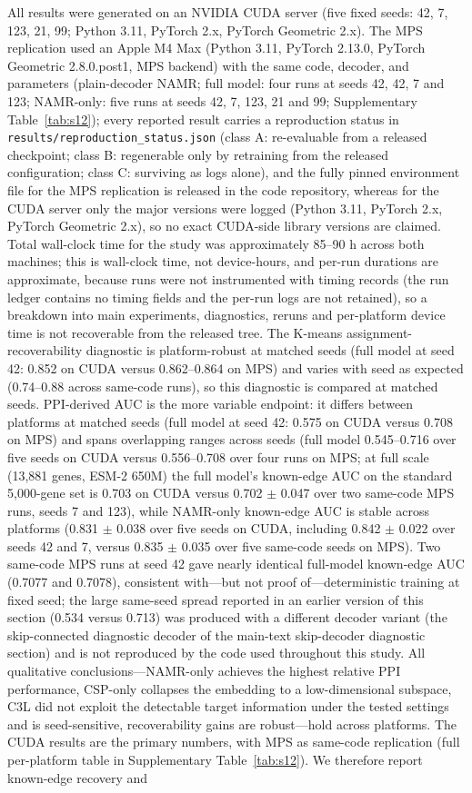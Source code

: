 \documentclass[11pt,a4paper]{article}
\newcommand{\supptab}[1]{Supplementary Table~\ref{#1}}
\begin{document}
All results were generated on an NVIDIA CUDA server (five fixed seeds: 42, 7, 123, 21, 99; Python 3.11, PyTorch 2.x, PyTorch Geometric 2.x). The MPS replication used an Apple M4 Max (Python 3.11, PyTorch 2.13.0, PyTorch Geometric 2.8.0.post1, MPS backend) with the same code, decoder, and parameters (plain-decoder NAMR; full model: four runs at seeds 42, 42, 7 and 123; NAMR-only: five runs at seeds 42, 7, 123, 21 and 99; \supptab{tab:s12}); every reported result carries a reproduction status in \texttt{results/reproduction\_\allowbreak status.\allowbreak json} (class A: re-evaluable from a released checkpoint; class B: regenerable only by retraining from the released configuration; class C: surviving as logs alone), and the fully pinned environment file for the MPS replication is released in the code repository, whereas for the CUDA server only the major versions were logged (Python 3.11, PyTorch 2.x, PyTorch Geometric 2.x), so no exact CUDA-side library versions are claimed. Total wall-clock time for the study was approximately 85--90 h across both machines; this is wall-clock time, not device-hours, and per-run durations are approximate, because runs were not instrumented with timing records (the run ledger contains no timing fields and the per-run logs are not retained), so a breakdown into main experiments, diagnostics, reruns and per-platform device time is not recoverable from the released tree. The K-means assignment-recoverability diagnostic is platform-robust at matched seeds (full model at seed 42: 0.852 on CUDA versus 0.862--0.864 on MPS) and varies with seed as expected (0.74--0.88 across same-code runs), so this diagnostic is compared at matched seeds. PPI-derived AUC is the more variable endpoint: it differs between platforms at matched seeds (full model at seed 42: 0.575 on CUDA versus 0.708 on MPS) and spans overlapping ranges across seeds (full model 0.545--0.716 over five seeds on CUDA versus 0.556--0.708 over four runs on MPS; at full scale (13,881 genes, ESM-2 650M) the full model's known-edge AUC on the standard 5,000-gene set is 0.703 on CUDA versus 0.702 $\pm$ 0.047 over two same-code MPS runs, seeds 7 and 123), while NAMR-only known-edge AUC is stable across platforms (0.831 $\pm$ 0.038 over five seeds on CUDA, including 0.842 $\pm$ 0.022 over seeds 42 and 7, versus 0.835 $\pm$ 0.035 over five same-code seeds on MPS). Two same-code MPS runs at seed 42 gave nearly identical full-model known-edge AUC (0.7077 and 0.7078), consistent with---but not proof of---deterministic training at fixed seed; the large same-seed spread reported in an earlier version of this section (0.534 versus 0.713) was produced with a different decoder variant (the skip-connected diagnostic decoder of the main-text skip-decoder diagnostic section) and is not reproduced by the code used throughout this study. All qualitative conclusions---NAMR-only achieves the highest relative PPI performance, CSP-only collapses the embedding to a low-dimensional subspace, C3L did not exploit the detectable target information under the tested settings and is seed-sensitive, recoverability gains are robust---hold across platforms. The CUDA results are the primary numbers, with MPS as same-code replication (full per-platform table in \supptab{tab:s12}). We therefore report known-edge recovery and 
\end{document}
